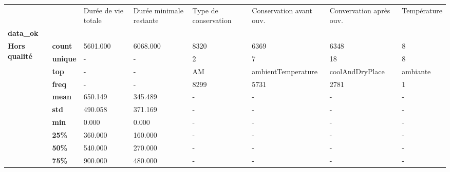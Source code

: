 \begin{tabularx}{\linewidth}{lXXXXXXX}
\toprule
           &     &  Durée de vie totale &  Durée minimale restante & Type de conservation & Conservation avant ouv. & Convervation après ouv. & Température \\
\textbf{data\_ok} & {} &                      &                          &                      &                         &                         &             \\
\midrule
\multirow{11}{*}{\textbf{Hors qualité}} & \textbf{count} &             5601.000 &                 6068.000 &                 8320 &                    6369 &                    6348 &           8 \\
           & \textbf{unique} &                    - &                        - &                    2 &                       7 &                      18 &           8 \\
           & \textbf{top} &                    - &                        - &                   AM &      ambientTemperature &         coolAndDryPlace &    ambiante \\
           & \textbf{freq} &                    - &                        - &                 8299 &                    5731 &                    2781 &           1 \\
           & \textbf{mean} &              650.149 &                  345.489 &                    - &                       - &                       - &           - \\
           & \textbf{std} &              490.058 &                  371.169 &                    - &                       - &                       - &           - \\
           & \textbf{min} &                0.000 &                    0.000 &                    - &                       - &                       - &           - \\
           & \textbf{25\%} &              360.000 &                  160.000 &                    - &                       - &                       - &           - \\
           & \textbf{50\%} &              540.000 &                  270.000 &                    - &                       - &                       - &           - \\
           & \textbf{75\%} &              900.000 &                  480.000 &                    - &                       - &                       - &           - \\

\end{tabularx}
